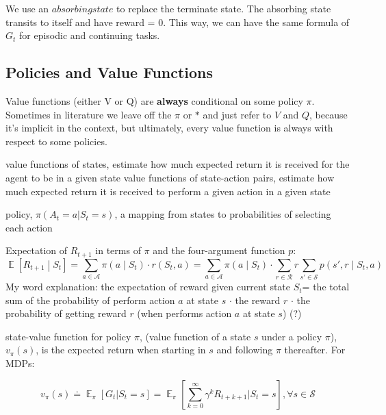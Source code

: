 \documentclass[lang=en,mode=geye,device=normal,color=blue,14pt]{elegantnote}
\DeclareMathOperator*{\E}{\mathbb{E}}
\DeclareMathOperator*{\1}{\mathbbm{1}}
\begin{document}
We use an $absorbing state$ to replace the terminate state. The absorbing state transits to itself and have reward = 0.
This way, we can have the same formula of $G_t$ for episodic and continuing tasks.

\subsection{Policies and Value Functions}

Value functions (either V or Q) are \textbf{always} conditional on some policy $\pi$. Sometimes in literature we leave off the $\pi$ or $*$ and just refer to $V$ and $Q$, because it’s implicit in the context, but ultimately, every value function is always with respect to some policies.

\begin{definition}
value functions of states, estimate how much expected return it is received for the agent to be in a given state
value functions of state-action pairs, estimate how much expected return it is received to perform a given action in a given state
\end{definition}

\begin{definition}
policy, $\pi(A_t=a|S_t=s)$, a mapping from states to probabilities of selecting each action
\end{definition}

Expectation of $R_{t+1}$ in terms of $\pi$ and the four-argument function $p$:
\[
\E\left[R_{t+1} \middle|S_{t}\right] = \sum_{a \in \mathcal{A}} \pi\left(a \middle| S_t\right) \cdot r(S_t, a) = \sum_{a \in \mathcal{A}} \pi\left(a \middle| S_t\right) \cdot \sum_{r \in \mathcal{R}} r \sum_{s' \in \mathcal{S}} p\left(s', r \middle| S_t, a\right)
\]
My word explanation: the expectation of reward given current state $S_t$= the total sum of the probability of perform action $a$ at state $s$ $\cdot$ the reward $r$ $\cdot$ the probability of getting reward $r$ (when performs action $a$ at state $s$) (?)

\begin{definition}
state-value function for policy $\pi$, (value function of a state $s$ under a policy $\pi$), $v_{\pi}(s)$, is the expected return when starting in $s$ and following $\pi$ thereafter. For MDPs:

$$ v_\pi(s) \doteq \E_\pi[G_t | S_t = s] = \E_\pi [ \sum_{k=0}^{\infty} \gamma^k R_{t+k+1} | S_t = s], \forall s \in \mathcal{S} $$
\end{definition}
\end{document}
